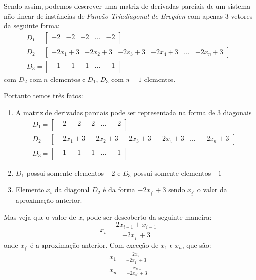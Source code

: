 \documentclass[10pt,a4paper]{article}
\begin{document}
	Sendo assim, podemos descrever uma matriz de derivadas parciais de um sistema não linear de instâncias de \textit{Função Triadiagonal de Broyden} com apenas $ 3 $ vetores da seguinte forma: 
	\begin{align*}
		& D_{1} = 
		\begin{bmatrix}
		-2 & -2  & -2 & \ldots & -2 \\
		\end{bmatrix} & \\
		& D_{2} = 
		\begin{bmatrix}
		-2x_{1} + 3 & - 2x_{2} + 3 & - 2x_{3} + 3 & - 2x_{4} + 3 & \ldots & - 2x_{n} + 3 
		\end{bmatrix} & \\
		& D_{3} = 
		\begin{bmatrix}
		-1 & -1  & -1 & \ldots & -1 \\
		\end{bmatrix} & 
	\end{align*}
	com $ D_{2} $ com $ n $ elementos e $ D_{1} $, $ D_{3} $ com $ n - 1 $ elementos.
	
	Portanto temos três fatos:
	
	\begin{enumerate}
		\item A matriz de derivadas parciais pode ser representada na forma de $ 3 $ diagonais 
		\begin{align*}
		& D_{1} = 
		\begin{bmatrix}
		-2 & -2  & -2 & \ldots & -2 \\
		\end{bmatrix} & \\
		& D_{2} = 
		\begin{bmatrix}
		-2x_{1} + 3 & - 2x_{2} + 3 & - 2x_{3} + 3 & - 2x_{4} + 3 & \ldots & - 2x_{n} + 3 
		\end{bmatrix} & \\
		& D_{3} = 
		\begin{bmatrix}
		-1 & -1  & -1 & \ldots & -1 \\
		\end{bmatrix} & 
		\end{align*}
		
		\item $ D_{1} $ possui somente elementos $ -2 $ e $ D_{3}  $ possui somente elementos $ -1 $
		
		\item Elemento $ x_{i} $ da diagonal $ D_{2} $ é da forma $  - 2x_{i^{'}} + 3 $ sendo $ x_{i^{'}} $ o valor da aproximação anterior.
	\end{enumerate}
	
	Mas veja que o valor de $ x_{i} $ pode ser descoberto da seguinte maneira: 
	$$ x_{i} = \frac{2 x_{i+1} + x_{i-1}}{-2 x_{i^{'}} + 3}  $$ 
	onde $ x_{i^{'}} $ é a aproximação anterior. Com exceção de $ x_{1} $ e $ x_{n} $, que são:
	\begin{align*}
		& x_{1} = \frac{2 x_{2}}{-2 x_{1^{'}} + 3} & \\ 
		& x_{n} = \frac{ - x_{n-1}}{-2 x_{n^{'}} + 3}
	\end{align*}
\end{document}
